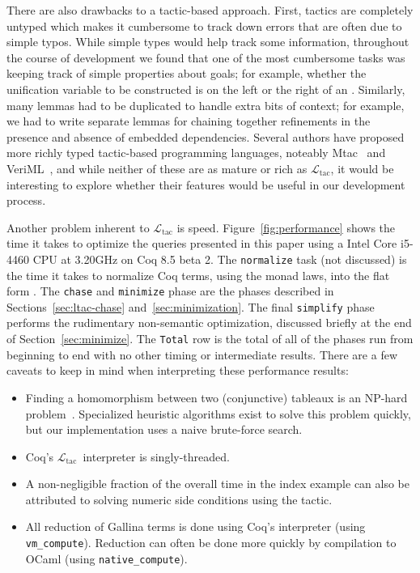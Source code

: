 \documentclass[preprint]{sigplanconf}
\newcommand{\ltac}[0]{\ensuremath{\mathcal{L}_{\mathrm{tac}}}}
\begin{document}
There are also drawbacks to a tactic-based approach.
First, tactics are completely untyped which makes it cumbersome to track down errors that are often due to simple typos.
While simple types would help track some information, throughout the course of development we found that one of the most cumbersome tasks was keeping track of simple properties about goals; for example, whether the unification variable to be constructed is on the left or the right of an .  Similarly, many lemmas had to be duplicated to handle extra bits of context; for example, we had to write separate lemmas for chaining together refinements in the presence and absence of embedded dependencies.  Several authors have proposed more richly typed tactic-based programming languages, noteably Mtac~\cite{ziliani2013mtac} and VeriML~\cite{stampoulis2010veriml}, and while neither of these are as mature or rich as \ltac, it would be interesting to explore whether their features would be useful in our development process.

Another problem inherent to \ltac{} is speed.
Figure~\ref{fig:performance} shows the time it takes to optimize the queries presented in this paper using a Intel Core i5-4460  CPU at 3.20GHz on Coq 8.5 beta 2.  The {\tt normalize} task (not discussed) is the time it takes to normalize Coq terms, using the monad laws, into the flat form .  The {\tt chase} and {\tt minimize} phase are the phases described in Sections~\ref{sec:ltac-chase} and~\ref{sec:minimization}.  The final {\tt simplify} phase performs the rudimentary non-semantic optimization, discussed briefly at the end of Section~\ref{sec:minimize}.  The {\tt Total} row is the total of all of the phases run from beginning to end with no other timing or intermediate results.  There are a few caveats to keep in mind when interpreting these performance results:
\begin{itemize}

\item Finding a homomorphism between two (conjunctive) tableaux is an NP-hard problem~\cite{Deutsch:2006:QRC:1121995.1122010}.  Specialized heuristic algorithms exist to solve this problem quickly, but our implementation uses a naive brute-force search.

\item Coq's \ltac \ interpreter is singly-threaded.

\item A non-negligible fraction of the overall time in the index example can also be attributed to solving numeric side conditions using the  tactic.

\item All reduction of Gallina terms is done using Coq's interpreter (using {\tt vm\_compute}).  Reduction can often be done more quickly by compilation to OCaml (using {\tt native\_compute}).  

\end{itemize}
\end{document}
